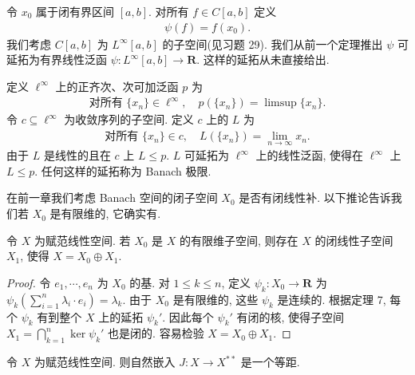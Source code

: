\documentclass[../../main.tex]{subfiles}
\begin{document}
\begin{example}\label{example:ch14-延拓C[a,b]}
令 $x_{0}$ 属于闭有界区间 $[a,b]$. 对所有 $f\in C[a,b]$ 定义
\begin{align*}
\psi(f)=f(x_{0}).
\end{align*}
我们考虑 $C[a,b]$ 为 $L^{\infty}[a,b]$ 的子空间(见习题 29). 我们从前一个定理推出 $\psi$ 可延拓为有界线性泛函 $\psi:L^{\infty}[a,b]\to\mathbf{R}$. 这样的延拓从未直接给出.
\end{example}

\begin{example}\label{example:ch14-Banach极限}
定义 $\ell^{\infty}$ 上的正齐次、次可加泛函 $p$ 为
\begin{align*}
\text{对所有 }\{x_{n}\}\in\ell^{\infty},\quad p(\{x_{n}\})=\limsup\{x_{n}\}.
\end{align*}
令 $c\subseteq\ell^{\infty}$ 为收敛序列的子空间. 定义 $c$ 上的 $L$ 为
\begin{align*}
\text{对所有 }\{x_{n}\}\in c,\quad L(\{x_{n}\})=\lim_{n\to\infty}x_{n}.
\end{align*}
由于 $L$ 是线性的且在 $c$ 上 $L\leqslant p$. $L$ 可延拓为 $\ell^{\infty}$ 上的线性泛函, 使得在 $\ell^{\infty}$ 上 $L\leqslant p$. 任何这样的延拓称为 Banach 极限.
\end{example}

在前一章我们考虑 Banach 空间的闭子空间 $X_{0}$ 是否有闭线性补. 以下推论告诉我们若 $X_{0}$ 是有限维的, 它确实有.

\begin{corollary}\label{corollary:ch14-有限维闭补}
令 $X$ 为赋范线性空间. 若 $X_{0}$ 是 $X$ 的有限维子空间, 则存在 $X$ 的闭线性子空间 $X_{1}$, 使得 $X=X_{0}\oplus X_{1}$.
\end{corollary}

\begin{proof}
令 $e_{1},\cdots,e_{n}$ 为 $X_{0}$ 的基. 对 $1\leqslant k\leqslant n$, 定义 $\psi_{k}:X_{0}\to\mathbf{R}$ 为 $\psi_{k}\left(\sum_{i=1}^{n}\lambda_{i}\cdot e_{i}\right)=\lambda_{k}$. 由于 $X_{0}$ 是有限维的, 这些 $\psi_{k}$ 是连续的. 根据定理 7, 每个 $\psi_{k}$ 有到整个 $X$ 上的延拓 $\psi_{k}'$. 因此每个 $\psi_{k}'$ 有闭的核, 使得子空间 $X_{1}=\bigcap_{k=1}^{n}\ker\psi_{k}'$ 也是闭的. 容易检验 $X=X_{0}\oplus X_{1}$.
\end{proof}

\begin{corollary}\label{corollary:ch14-J等距}
令 $X$ 为赋范线性空间. 则自然嵌入 $J:X\to X^{**}$ 是一个等距.
\end{corollary}
\end{document}
